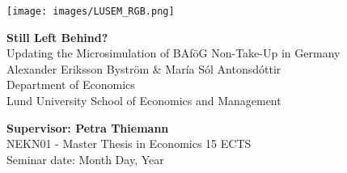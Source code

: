 
    \texttt{[image: images/LUSEM\_RGB.png]} %

\vspace{2cm}
    \begin{center}       
        \vspace*{2cm}
        {\LARGE {\textbf{Still Left Behind?}  \\ 
            Updating the Microsimulation of BAföG Non-Take-Up in Germany
        }} \\
        \vspace{1cm}
        \Large{Alexander Eriksson Byström \& María Sól Antonsdóttir} \normalsize{\\ Department of Economics \\ Lund University School of Economics and Management}
    \end{center}
    \vspace{2cm}

\vfill
\noindent 
\textbf{Supervisor: Petra Thiemann} \\ 
NEKN01 - Master Thesis in Economics 15 ECTS \\ 
Seminar date: Month Day, Year
\thispagestyle{empty}

\newpage
\tableofcontents
\thispagestyle{empty}
